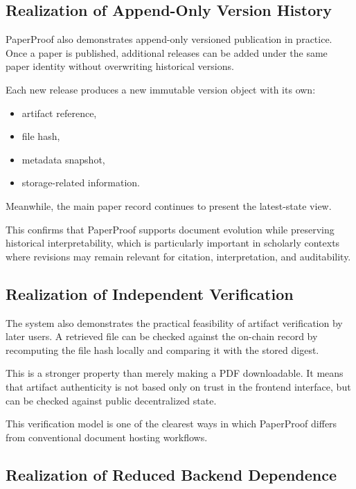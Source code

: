 \documentclass[journal]{IEEEtran}
\begin{document}
\subsection{Realization of Append-Only Version History}

PaperProof also demonstrates append-only versioned publication in practice. Once a paper is published, additional releases can be added under the same paper identity without overwriting historical versions.

Each new release produces a new immutable version object with its own:
\begin{itemize}
    \item artifact reference,
    \item file hash,
    \item metadata snapshot,
    \item storage-related information.
\end{itemize}


Meanwhile, the main paper record continues to present the latest-state view.

This confirms that PaperProof supports document evolution while preserving historical interpretability, which is particularly important in scholarly contexts where revisions may remain relevant for citation, interpretation, and auditability.

\subsection{Realization of Independent Verification}

The system also demonstrates the practical feasibility of artifact verification by later users. A retrieved file can be checked against the on-chain record by recomputing the file hash locally and comparing it with the stored digest.

This is a stronger property than merely making a PDF downloadable. It means that artifact authenticity is not based only on trust in the frontend interface, but can be checked against public decentralized state.

This verification model is one of the clearest ways in which PaperProof differs from conventional document hosting workflows.

\subsection{Realization of Reduced Backend Dependence}
\end{document}
